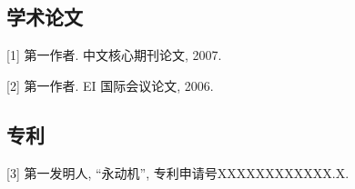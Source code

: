 
\begin{achievements}

\subsection*{\qquad 学术论文}

[1] 第一作者. 中文核心期刊论文, 2007.

[2] 第一作者. EI 国际会议论文, 2006.

\subsection*{\qquad 专利}

[3] 第一发明人, “永动机”, 专利申请号XXXXXXXXXXXX.X.

\end{achievements}
